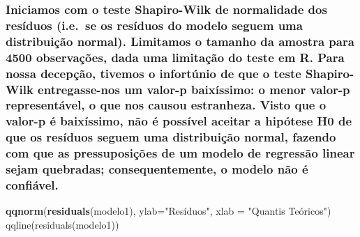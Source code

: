 \documentclass[]{article}
\newenvironment{Shaded}{\begin{snugshade}}{\end{snugshade}}
\newcommand{\DataTypeTok}[1]{\textcolor[rgb]{0.13,0.29,0.53}{#1}}
\newcommand{\KeywordTok}[1]{\textcolor[rgb]{0.13,0.29,0.53}{\textbf{#1}}}
\newcommand{\NormalTok}[1]{#1}
\newcommand{\StringTok}[1]{\textcolor[rgb]{0.31,0.60,0.02}{#1}}
\begin{document}
\hypertarget{iniciamos-com-o-teste-shapiro-wilk-de-normalidade-dos-residuos-i.e.se-os-residuos-do-modelo-seguem-uma-distribuicao-normal.-limitamos-o-tamanho-da-amostra-para-4500-observacoes-dada-uma-limitacao-do-teste-em-r.-para-nossa-decepcao-tivemos-o-infortunio-de-que-o-teste-shapiro-wilk-entregasse-nos-um-valor-p-baixissimo-o-menor-valor-p-representavel-o-que-nos-causou-estranheza.-visto-que-o-valor-p-e-baixissimo-nao-e-possivel-aceitar-a-hipotese-h0-de-que-os-residuos-seguem-uma-distribuicao-normal-fazendo-com-que-as-pressuposicoes-de-um-modelo-de-regressao-linear-sejam-quebradas-consequentemente-o-modelo-nao-e-confiavel.}{%
\subsubsection{Iniciamos com o teste Shapiro-Wilk de normalidade dos
resíduos (i.e.~se os resíduos do modelo seguem uma distribuição normal).
Limitamos o tamanho da amostra para 4500 observações, dada uma limitação
do teste em R. Para nossa decepção, tivemos o infortúnio de que o teste
Shapiro-Wilk entregasse-nos um valor-p baixíssimo: o menor valor-p
representável, o que nos causou estranheza. Visto que o valor-p é
baixíssimo, não é possível aceitar a hipótese H0 de que os resíduos
seguem uma distribuição normal, fazendo com que as pressuposições de um
modelo de regressão linear sejam quebradas; consequentemente, o modelo
não é
confiável.}\label{iniciamos-com-o-teste-shapiro-wilk-de-normalidade-dos-residuos-i.e.se-os-residuos-do-modelo-seguem-uma-distribuicao-normal.-limitamos-o-tamanho-da-amostra-para-4500-observacoes-dada-uma-limitacao-do-teste-em-r.-para-nossa-decepcao-tivemos-o-infortunio-de-que-o-teste-shapiro-wilk-entregasse-nos-um-valor-p-baixissimo-o-menor-valor-p-representavel-o-que-nos-causou-estranheza.-visto-que-o-valor-p-e-baixissimo-nao-e-possivel-aceitar-a-hipotese-h0-de-que-os-residuos-seguem-uma-distribuicao-normal-fazendo-com-que-as-pressuposicoes-de-um-modelo-de-regressao-linear-sejam-quebradas-consequentemente-o-modelo-nao-e-confiavel.}}

\begin{Shaded}
\begin{Highlighting}[]
  \KeywordTok{qqnorm}\NormalTok{(}\KeywordTok{residuals}\NormalTok{(modelo1), }\DataTypeTok{ylab=}\StringTok{"Resíduos"}\NormalTok{, }\DataTypeTok{xlab =} \StringTok{"Quantis Teóricos")}
\StringTok{  qqline(residuals(modelo1))}
\end{Highlighting}
\end{Shaded}
\end{document}

